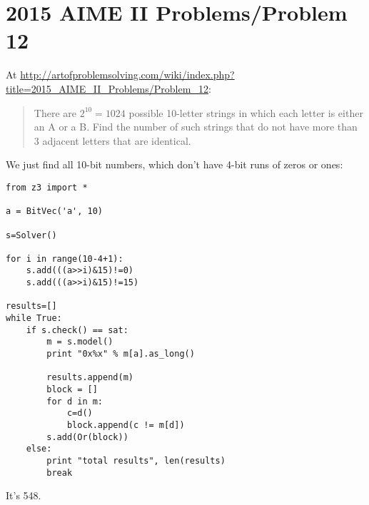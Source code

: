 \section{2015 AIME II Problems/Problem 12}

At \url{http://artofproblemsolving.com/wiki/index.php?title=2015_AIME_II_Problems/Problem_12}:

\begin{framed}
\begin{quotation}
There are $2^{10} = 1024$ possible 10-letter strings in which each letter is either an A or a B.
Find the number of such strings that do not have more than 3 adjacent letters that are identical. 
\end{quotation}
\end{framed}

We just find all 10-bit numbers, which don't have 4-bit runs of zeros or ones:

\begin{lstlisting}
from z3 import *

a = BitVec('a', 10)

s=Solver()

for i in range(10-4+1):
    s.add(((a>>i)&15)!=0)
    s.add(((a>>i)&15)!=15)

results=[]
while True:
    if s.check() == sat:
        m = s.model()
        print "0x%x" % m[a].as_long()

        results.append(m)
        block = []
        for d in m:
            c=d()
            block.append(c != m[d])
        s.add(Or(block))
    else:
        print "total results", len(results)
        break
\end{lstlisting}

It's 548.

